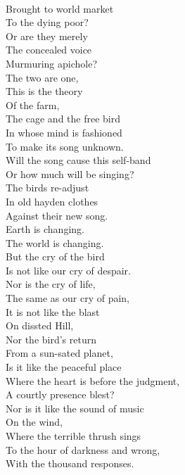 \documentclass[smalldemyvopaper,11pt,twoside,onecolumn,openright,extrafontsizes]{memoir}
\begin{document}
\\Brought to world market
\\To the dying poor?
\\Or are they merely
\\The concealed voice
\\Murmuring apichole?
\\The two are one,
\\This is the theory
\\Of the farm,
\\The cage and the free bird
\\In whose mind is fashioned
\\To make its song unknown.
\\Will the song cause this self-band
\\Or how much will be singing?
\\The birds re-adjust
\\In old hayden clothes
\\Against their new song.
\\Earth is changing.
\\The world is changing.
\\But the cry of the bird
\\Is not like our cry of despair.
\\Nor is the cry of life,
\\The same as our cry of pain,
\\It is not like the blast
\\On dissted Hill,
\\Nor the bird's return
\\From a sun-sated planet,
\\Is it like the peaceful place
\\Where the heart is before the judgment,
\\A courtly presence blest?
\\Nor is it like the sound of music
\\On the wind,
\\Where the terrible thrush sings
\\To the hour of darkness and wrong,
\\With the thousand responses.
\end{document}
